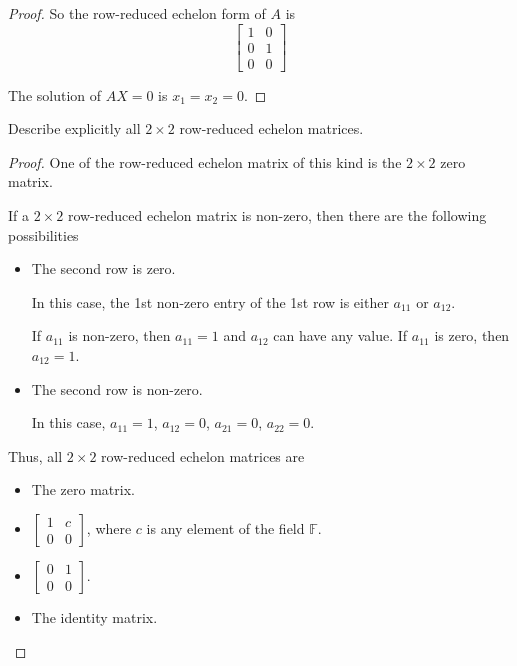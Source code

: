 \begin{proof}
    So the row-reduced echelon form of $A$ is
    \[
        \begin{bmatrix}
            1 & 0 \\
            0 & 1 \\
            0 & 0
        \end{bmatrix}
    \]

    The solution of $AX = 0$ is $x_{1} = x_{2} = 0$.
\end{proof}

\begin{exercise}
    Describe explicitly all $2\times 2$ row-reduced echelon matrices.
\end{exercise}

\begin{proof}
    One of the row-reduced echelon matrix of this kind is the $2\times 2$ zero matrix.

    If a $2\times 2$ row-reduced echelon matrix is non-zero, then there are the following possibilities
    \begin{itemize}
        \item The second row is zero.

              In this case, the 1st non-zero entry of the 1st row is either $a_{11}$ or $a_{12}$.

              If $a_{11}$ is non-zero, then $a_{11} = 1$ and $a_{12}$ can have any value. If $a_{11}$ is zero, then $a_{12} = 1$.
        \item The second row is non-zero.

              In this case, $a_{11} = 1$, $a_{12} = 0$, $a_{21} = 0$, $a_{22} = 0$.
    \end{itemize}

    Thus, all $2\times 2$ row-reduced echelon matrices are
    \begin{itemize}
        \item The zero matrix.
        \item $\begin{bmatrix}1 & c \\ 0 & 0\end{bmatrix}$, where $c$ is any element of the field $\mathbb{F}$.
        \item $\begin{bmatrix}0 & 1 \\ 0 & 0\end{bmatrix}$.
        \item The identity matrix.
    \end{itemize}
\end{proof}

